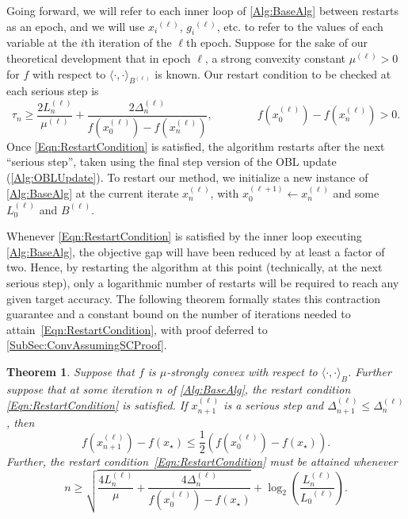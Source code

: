 \documentclass[11pt]{article}
\numberwithin{equation}{section}
\newtheorem{theorem}[thm]{Theorem}
\newcommand{\idxEpoch}{\ell}
\newcommand{\epoch}[1]{{#1}^{(\idxEpoch)}}
\theoremstyle{definition}
\theoremstyle{plain}
\theoremstyle{definition}
\begin{document}
Going forward, we will refer to each inner loop of \cref{Alg:BaseAlg} between restarts as an epoch, and we will use $\epoch{x_i}$, $\epoch{g_i}$, etc. to refer to the values of each variable at the $i$th iteration of the $\idxEpoch$th epoch.
Suppose for the sake of our theoretical development that in epoch $\ell$, a strong convexity constant $\epoch{\mu}>0$ for $f$ with respect to $\langle \cdot,\cdot\rangle_{\epoch{B}}$ is known.
Our restart condition to be checked at each serious step is
\begin{equation} \label{Eqn:RestartCondition}
    \tau_n \geq \frac{2 \epoch{L}_n}{\epoch{\mu}} + \frac{2 \epoch{\Delta}_n}{f(\epoch{x}_0) - f(\epoch{x}_n)}, \qquad\qquad f(\epoch{x}_0) - f(\epoch{x}_n) >0. 
\end{equation}
Once \eqref{Eqn:RestartCondition} is satisfied, the algorithm restarts after the next ``serious step'', taken using the final step version of the OBL update (\cref{Alg:OBLUpdate}). To restart our method, we initialize a new instance of \cref{Alg:BaseAlg} at the current iterate $\epoch{x}_n$, with $x_0^{(\idxEpoch+1)} \leftarrow \epoch{x}_n$ and some $\epoch{L}_0$ and $\epoch{B}$. 

Whenever \eqref{Eqn:RestartCondition} is satisfied by the inner loop executing \cref{Alg:BaseAlg}, the objective gap will have been reduced by at least a factor of two. Hence, by restarting the algorithm at this point (technically, at the next serious step), only a logarithmic number of restarts will be required to reach any given target accuracy. The following theorem formally states this contraction guarantee and a constant bound on the number of iterations needed to attain~\eqref{Eqn:RestartCondition}, with proof deferred to \cref{SubSec:ConvAssumingSCProof}. 

\begin{theorem} \label{Thm:ConvergenceAssumingSC}
    Suppose that $f$ is $\mu$-strongly convex with respect to $\langle \cdot,\cdot\rangle_B$. Further suppose that at some iteration $n$ of \cref{Alg:BaseAlg}, the restart condition \eqref{Eqn:RestartCondition} is satisfied. If $\epoch{x}_{n+1}$ is a serious step and $\epoch{\Delta}_{n+1} \leq \epoch{\Delta}_n$, then
    \begin{equation} \label{Eqn:AdaptiveConvergenceRate}
        f(\epoch{x}_{n+1}) - f(x_\star)\leq \frac{1}{2}\left(f(\epoch{x}_0) - f(x_\star)\right).
    \end{equation}
    Further, the restart condition~\eqref{Eqn:RestartCondition} must be attained whenever
    \begin{equation*}
    n \geq \sqrt{\frac{4 \epoch{L}_n}{\mu} + \frac{4 \epoch{\Delta}_n}{f(\epoch{x}_0) - f(x_\star)} } + \log_2\left(\frac{\epoch{L}_n}{\epoch{L_0}}\right).
    \end{equation*}
\end{theorem}
\end{document}
